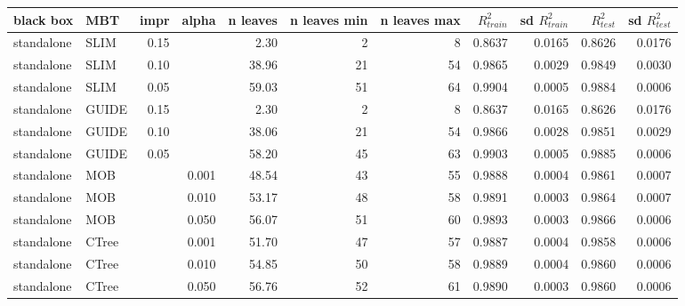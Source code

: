 \begin{table}[!htb]

\centering \tiny
\begin{tabular}[t]{l|l|r|r|r|r|r|r|r|r|r}
\hline
black box & MBT & impr & alpha & n leaves & n leaves min & n leaves max &  $R^2_{train}$ & sd $R^2_{train}$ & $R^2_{test}$ & sd $R^2_{test}$\\
\hline
standalone & SLIM & 0.15 & & 2.30 & 2 & 8 & 0.8637 & 0.0165 & 0.8626 & 0.0176\\
standalone & SLIM & 0.10 & & 38.96 & 21 & 54 & 0.9865 & 0.0029 & 0.9849 & 0.0030\\
standalone & SLIM & 0.05 & & 59.03 & 51 & 64 & 0.9904 & 0.0005 & 0.9884 & 0.0006\\
standalone & GUIDE & 0.15 & & 2.30 & 2 & 8 & 0.8637 & 0.0165 & 0.8626 & 0.0176\\
standalone & GUIDE & 0.10 & & 38.06 & 21 & 54 & 0.9866 & 0.0028 & 0.9851 & 0.0029\\
standalone & GUIDE & 0.05 & & 58.20 & 45 & 63 & 0.9903 & 0.0005 & 0.9885 & 0.0006\\
standalone & MOB & & 0.001 & 48.54 & 43 & 55 & 0.9888 & 0.0004 & 0.9861 & 0.0007\\
standalone & MOB & & 0.010 & 53.17 & 48 & 58 & 0.9891 & 0.0003 & 0.9864 & 0.0007\\
standalone & MOB & & 0.050 & 56.07 & 51 & 60 & 0.9893 & 0.0003 & 0.9866 & 0.0006\\
standalone & CTree & & 0.001 & 51.70 & 47 & 57 & 0.9887 & 0.0004 & 0.9858 & 0.0006\\
standalone & CTree & & 0.010 & 54.85 & 50 & 58 & 0.9889 & 0.0004 & 0.9860 & 0.0006\\
standalone & CTree & & 0.050 & 56.76 & 52 & 61 & 0.9890 & 0.0003 & 0.9860 & 0.0006\\


\end{tabular}
\end{table}
